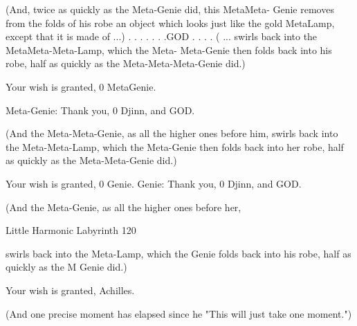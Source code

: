                        (And, twice as quickly as the Meta-Genie did, this MetaMeta-
                       Genie removes from the folds of his robe an object which looks
                       just like the gold MetaLamp, except that it is made of ...)
                       .
                           .
                               .
                                   .
                                           .
                                               . .{GOD}
                                           .
                                       .
                               .
                       .
                       ( ... swirls back into the MetaMeta-Meta-Lamp, which the Meta-
                       Meta-Genie then folds back into his robe, half as quickly as the
                       Meta-Meta-Meta-Genie did.)

                       Your wish is granted, 0 MetaGenie.

                    Meta-Genie: Thank you, 0 Djinn, and GOD.

                  (And the Meta-Meta-Genie, as all the higher ones before him, swirls
                  back into the Meta-Meta-Lamp, which the Meta-Genie then folds back
                  into her robe, half as quickly as the Meta-Meta-Genie did.)

                 Your wish is granted, 0 Genie.
          Genie: Thank you, 0 Djinn, and GOD.

              (And the Meta-Genie, as all the higher ones before her,




Little Harmonic Labyrinth                                                          120

          swirls back into the Meta-Lamp, which the Genie folds back into his robe,
          half as quickly as the M Genie did.)

             Your wish is granted, Achilles.

             (And one precise moment has elapsed since he "This will just take one
             moment.")

